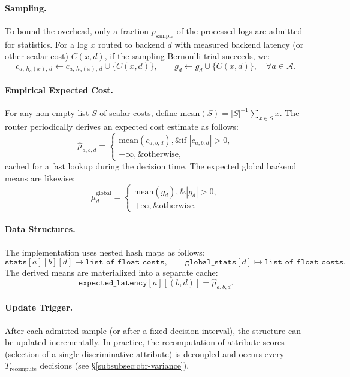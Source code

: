 \paragraph{Sampling.}
To bound the overhead, only a fraction $p_{\text{sample}}$ of the processed logs are admitted for statistics. For a log $x$ routed to backend $d$ with measured backend latency (or other scalar cost) $C(x,d)$, if the sampling Bernoulli trial succeeds, we:
\[
c_{a,\, h_a(x),\, d} \gets c_{a,\, h_a(x),\, d} \cup \{C(x,d)\}, \qquad
g_d \gets g_d \cup \{C(x,d)\}, \quad \forall a\in\mathcal{A}.
\]

\paragraph{Empirical Expected Cost.}
For any non-empty list $S$ of scalar costs, define $\mathrm{mean}(S) = |S|^{-1}\sum_{x\in S} x$. The router periodically derives an expected cost estimate as follows:
\[
\widehat{\mu}_{a,b,d} =
\begin{cases}
\mathrm{mean}(c_{a,b,d}),\& \text{if } |c_{a,b,d}| > 0,\\
+\infty,\& \text{otherwise},
\end{cases}
\]
cached for a fast lookup during the decision time. The expected global backend means are likewise:
\[
\widehat{\mu}_{d}^{\text{global}} =
\begin{cases}
\mathrm{mean}(g_d),\& |g_d|>0,\\
+\infty,\& \text{otherwise}.
\end{cases}
\]

\paragraph{Data Structures.}
The implementation uses nested hash maps as follows:
\[
\texttt{stats}[a][b][d] \mapsto \texttt{list of float costs}, \qquad
\texttt{global\_stats}[d] \mapsto \texttt{list of float costs}.
\]
The derived means are materialized into a separate cache:
\[
\texttt{expected\_latency}[a][(b,d)] = \widehat{\mu}_{a,b,d}.
\]

\paragraph{Update Trigger.}
After each admitted sample (or after a fixed decision interval), the structure can be updated incrementally. In practice, the recomputation of attribute scores (selection of a single discriminative attribute) is decoupled and occurs every $T_{\text{recompute}}$ decisions (see \S\ref{subsubsec:cbr-variance}).

